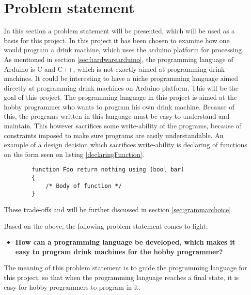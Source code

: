 \section{Problem statement}
In this section a problem statement will be presented, which will be used as a basis for this project. In this project it has been chosen to examine how one would program a drink machine, which uses the arduino platform for processing. As mentioned in section \ref{sec:hardwarearduino}, the programming language of Arduino is C and C++, which is not exactly aimed at programming drink machines. It could be interesting to have a niche programming language aimed directly at programming drink machines on Arduino platform. This will be the goal of this project. The programming language in this project is aimed at the hobby programmer who wants to program his own drink machine. Because of this, the programs written in this language must be easy to understand and maintain. This however sacrifices some write-ability of the programs, because of constraints imposed to make sure programs are easily understandable. An example of a design decision which sacrifices write-ability is declaring of functions on the form seen on listing \ref{declaringFunction}.

\begin{code}
	\begin{lstlisting}
		function Foo return nothing using (bool bar)
		{
			/* Body of function */
		}
	\end{lstlisting}
\end{code}
These trade-offs and will be further discussed in section \ref{sec:grammarchoice}.

Based on the above, the following problem statement comes to light:
\begin{itemize}
	\item \textbf{How can a programming language be developed, which makes it easy to program drink machines for the hobby programmer?}
\end{itemize}
The meaning of this problem statement is to guide the programming language for this project, so that when the programming language reaches a final state, it is easy for hobby programmers to program in it. 

